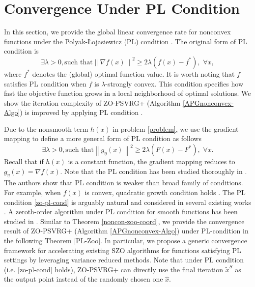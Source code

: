 \documentclass{article}
\newcommand{\norm}[1]{\left\lVert#1\right\rVert}
\theoremstyle{definition}
\theoremstyle{remark}
\begin{document}
\section{Convergence Under PL Condition}
{\color{Violet} In this section, we provide the global linear convergence rate for nonconvex functions under the Polyak-Łojasiewicz
(PL) condition \cite{polyak1963gradient}.}
The original form of PL condition is
\begin{equation}
\exists \lambda >0, \text{such~that} \norm{\nabla f(x)}^2 \geq 2\lambda (f(x) - f^*),\,\, \forall x,
\end{equation}
where $f^*$ denotes the (global) optimal function value. It is worth noting that $f$ satisfies PL condition when $f$ is $\lambda$-strongly convex.
{\color{RubineRed}
This condition specifies how fast the objective function grows in a local neighborhood of optimal solutions.
}
{\color{Brown} We show the iteration complexity of ZO-PSVRG+ (Algorithm \ref{APGnonconvex-Algo}) is improved by applying PL condition .}



Due to the nonsmooth term $h(x)$ in problem \eqref{problem}, we use the gradient mapping to define a more general form of PL condition as follows
\begin{equation}\label{zo-pl-cond}
\exists \lambda >0, \text{such~that} \norm{g_{\eta}(x)}^2 \geq 2\lambda (F(x) - F^*),\,\, \forall x.
\end{equation}
Recall that if $h(x)$ is a constant function, the gradient mapping reduces to $g_{\eta}(x) = \nabla f(x)$.
{\color{RubineRed}
Note that the PL condition has been studied thoroughly in \cite{karimi2016linear}. The authors show that PL condition is weaker than broad family of  conditions. For example, when $f(x)$ is convex,  quadratic growth condition holds \cite{luo1993error,anitescu2000degenerate}. 
}
The PL condition \eqref{zo-pl-cond} is arguably natural and considered in several existing works \cite{li2018simple}. A zeroth-order algorithm under PL condition for smooth functions has been studied in \cite{ji2019improved}.
{\color{Violet}
Similar to Theorem \ref{noncon-zoo-coord}, we provide the convergence result of ZO-PSVRG+ (Algorithm \ref{APGnonconvex-Algo}) under PL-condition in the
following Theorem \ref{PL-Zoo}. {\color{RubineRed}
In particular, we propose a generic convergence framework for accelerating existing SZO algorithms for functions satisfying PL settings by leveraging variance reduced methods. 
}
Note that under PL condition (i.e. \eqref{zo-pl-cond} holds), ZO-PSVRG+ can directly use the final iteration $\tilde{x}^S$
as the output point instead of the randomly chosen
one $\hat{x}$. 
}
\end{document}
